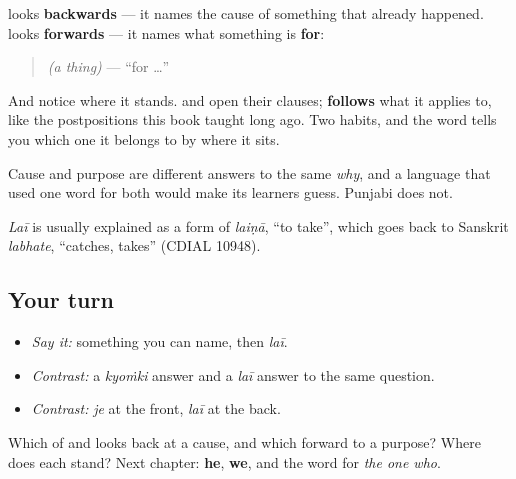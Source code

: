 \begin{cousinweb}
\textbf{} looks \textbf{backwards} — it names the cause of something that already happened. \textbf{} looks \textbf{forwards} — it names what something is \textbf{for}:

\begin{quote}
\emph{(a thing)} \textbf{} — \textquotedblleft{}for …\textquotedblright{}
\end{quote}

And notice where it stands. \textbf{} and \textbf{} open their clauses; \textbf{} \textbf{follows} what it applies to, like the postpositions this book taught long ago. Two habits, and the word tells you which one it belongs to by where it sits.

Cause and purpose are different answers to the same \emph{why}, and a language that used one word for both would make its learners guess. Punjabi does not.

\emph{Laī} is usually explained as a form of \emph{laiṇā}, \textquotedblleft{}to take\textquotedblright{}, which goes back to Sanskrit \emph{labhate}, \textquotedblleft{}catches, takes\textquotedblright{} (CDIAL 10948).
\end{cousinweb}

\subsection*{Your turn}
\begin{itemize}
\raggedright
  \item \emph{Say it:} something you can name, then \emph{laī}.
  \item \emph{Contrast:} a \emph{kyoṁki} answer and a \emph{laī} answer to the same question.
  \item \emph{Contrast:} \emph{je} at the front, \emph{laī} at the back.
\end{itemize}

\begin{tcolorbox}[breakable,colback=teal!4,colframe=teal!35!black,title={Before you move on}]
Which of \textbf{} and \textbf{} looks back at a cause, and which forward to a purpose? Where does each stand? Next chapter: \textbf{he}, \textbf{we}, and the word for \emph{the one who}.
\end{tcolorbox}
